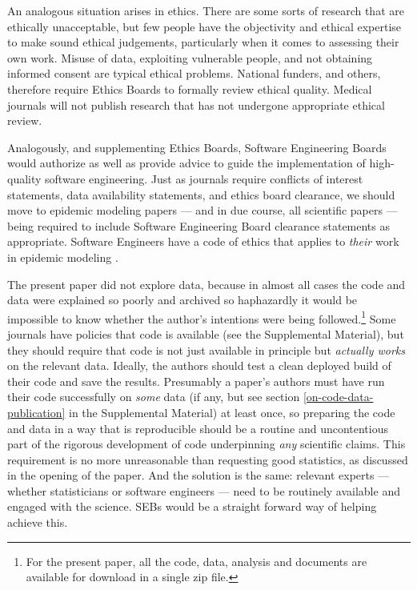 \documentclass[10pt,letterpaper]{article}
\def\supplement{Supplemental Material}
\begin{document}
An analogous situation arises in ethics. There are some sorts of research that are ethically unacceptable, but few people have the objectivity and ethical expertise to make sound ethical judgements, particularly when it comes to assessing their own work. Misuse of data, exploiting vulnerable people, and not obtaining informed consent are typical ethical problems. National funders, and others, therefore require Ethics Boards to formally review ethical quality. Medical journals will not publish research that has not undergone appropriate ethical review. 

Analogously, and supplementing Ethics Boards, Software Engineering Boards would authorize as well as provide advice to guide the implementation of high-quality software engineering. Just as journals require conflicts of interest statements, data availability statements, and ethics board clearance, we should move to epidemic modeling papers --- and in due course, all scientific papers --- being required to include Software Engineering Board clearance statements as appropriate. {Software Engineers have a code of ethics that applies to \emph{their\/} work in epidemic modeling \cite{ethics-code}.}

{The present paper did not explore data, because in almost all cases the code and data were explained so poorly and archived so haphazardly it would be impossible to know whether the author's intentions were being followed.\footnote{{For the present paper, all the code, data, analysis and documents are available for download in a single zip file.}} Some journals have policies that code is available (see the \supplement), but they should require that code is not just available in principle but \emph{actually works\/} on the relevant data. Ideally, the authors should test a clean deployed build of their code and save the results. Presumably a paper's authors must have run their code successfully on \emph{some\/} data (if any, but see section \ref{on-code-data-publication} in the \supplement) at least once, so preparing the code and data in a way that is reproducible should be a routine and uncontentious part of the rigorous development of  code underpinning \emph{any\/} scientific claims. This requirement is no more unreasonable than requesting good statistics, as discussed in the opening of the paper. And the solution is the same: relevant experts --- whether statisticians or software engineers --- need to be routinely available and engaged with the science. SEBs would be a straight forward way of helping achieve this.}
\end{document}
